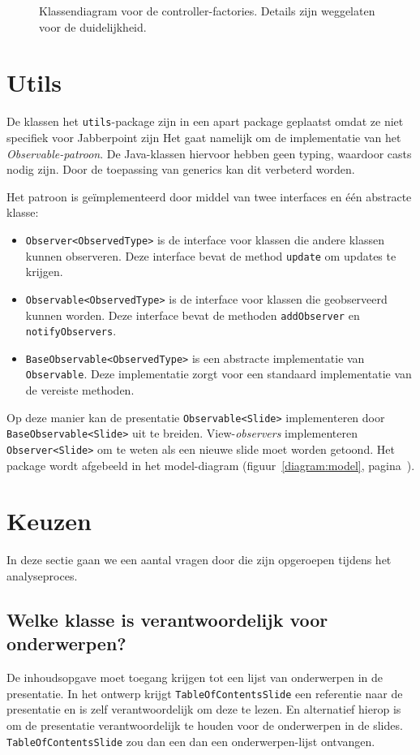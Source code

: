 \documentclass[a4paper]{article}
\newcommand{\question}[1]{
  \subsection{#1}
}
\newcommand{\code}[1]{\lstinline[columns=fixed]{#1}}
\newcommand{\diagram}[3][1.3]{
	\begin{figure}[!htb]
	 \caption{#3}
	 \label{diagram:#2}
	 \makebox[\textwidth][c]{\texttt{[image: Diagrams/\#2.pdf]}}%
	\end{figure}
}
\begin{document}
			\diagram[0.8]{controller-factories}{
				Klassendiagram voor de controller-factories.\label{diagram:controller-factories}
				Details zijn weggelaten voor de duide\-lijk\-heid.
			}

	\section{Utils}\label{sec:utils}
		De klassen het \code{utils}-package zijn in een apart package geplaatst omdat ze niet specifiek voor Jabberpoint zijn
		Het gaat namelijk om de implementatie van het \textit{Observable-patroon}.
		De Java-klassen hiervoor hebben geen typing, waardoor casts nodig zijn.
		Door de toepassing van generics kan dit verbeterd worden.
		
		Het patroon is geïmplementeerd door middel van twee interfaces en één abstracte klasse:
		\begin{itemize}
			\item \code{Observer<ObservedType>} is de interface voor klassen die andere klassen kunnen observeren.
				Deze interface bevat de method \code{update} om updates te krijgen.
			\item \code{Observable<ObservedType>} is de interface voor klassen die geobserveerd kunnen worden.
				Deze interface bevat de methoden \code{addObserver} en \code{notifyObservers}.
			\item \code{BaseObservable<ObservedType>} is een abstracte implementatie van \code{Observable}.
				Deze implementatie zorgt voor een standaard implementatie van de vereiste methoden.
		\end{itemize}

		Op deze manier kan de presentatie \code{Observable<Slide>} implementeren door \code{BaseObservable<Slide>} uit te breiden.
		View-\textit{observers} implementeren \code{Observer<Slide>} om te weten als een nieuwe slide moet worden getoond.
		Het package wordt afgebeeld in het model-diagram (figuur~\ref{diagram:model}, pagina~\pageref{diagram:model}).

\section{Keuzen}\label{sec:keuzen}
    In deze sectie gaan we een aantal vragen door die zijn opgeroepen tijdens het analyseproces.
   
    \question{Welke klasse is verantwoordelijk voor onderwerpen?}
		De inhoudsopgave moet toegang krijgen tot een lijst van onderwerpen in de presentatie.
		In het ontwerp krijgt \code{TableOfContentsSlide} een referentie naar de presentatie en is zelf verantwoordelijk om deze te lezen.
		En alternatief hierop is om de presentatie verantwoordelijk te houden voor de onderwerpen in de slides.
		\code{TableOfContentsSlide} zou dan een dan een onderwerpen-lijst ontvangen.
\end{document}

